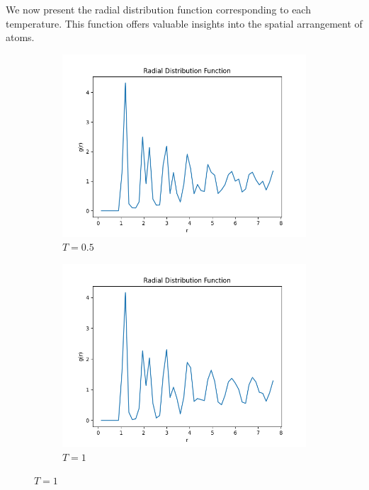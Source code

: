 \documentclass{article}
\begin{document}
We now present the radial distribution function corresponding to each temperature. This function offers valuable insights into the spatial arrangement of atoms.
\begin{figure}[H]
    \centering
    \begin{subfigure}{0.495\linewidth}
        \centering
        \includegraphics[width=\textwidth]{images/Radial0.5.png}
        \caption{$T=0.5$}
    \end{subfigure}
    \hfill
    \begin{subfigure}{0.495\linewidth}
        \centering
        \includegraphics[width=\textwidth]{images/Radial1.png}
        \caption{$T=1$}
    \end{subfigure}
\end{figure}
\end{document}
